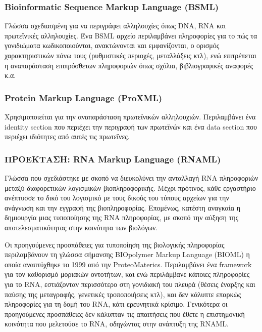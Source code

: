         \subsubsection{Bioinformatic Sequence Markup Language (BSML)}
            Γλώσσα σχεδιασμένη για να περιγράφει αλληλουχίες όπως DNA, RNA και πρωτεϊνικές αλληλουχίες.
            Ένα BSML αρχείο περιλαμβάνει πληροφορίες για το πώς τα γονιδιώματα κωδικοποιούνται, ανακτώνονται και εμφανίζονται, ο ορισμός χαρακτηριστικών πάνω τους (ρυθμιστικές περιοχές, μεταλλάξεις κτλ), ενώ επιτρέπεται η αναπαράσταση επιπρόσθετων πληροφοριών όπως σχόλια, βιβλιογραφικές αναφορές κ.α.

        \subsubsection{Protein Markup Language (ProXML)}
            Χρησιμοποιείται για την αναπαράσταση πρωτεϊνικών αλληλουχιών.
            Περιλαμβάνει ένα identity section που περιέχει την περιγραφή των πρωτεϊνών και ένα data section που περιέχει ιδιότητες από αυτές τις πρωτεΐνες.

        \subsubsection{ΠΡΟΕΚΤΑΣΗ: RNA Markup Language (RNAML)}
            Γλώσσα που σχεδιάστηκε με σκοπό να διευκολύνει την ανταλλαγή RNA πληροφοριών μεταξύ διαφορετικών λογισμικών βιοπληροφορικής. \cite{RNAML}
            Μέχρι πρότινος, κάθε εργαστήριο ανέπτυσσε το δικό του λογισμικό με τους δικούς του τύπους αρχείων για την ανάγνωση και την εγγραφή της βιοπληροφορίας.
            Επομένως, κατέστη αναγκαία η δημιουργία μιας τυποποίησης της RNA πληροφορίας, με σκοπό την αύξηση της αποτελεσματικότητας στην κοινότητα των βιολόγων.

            Οι προηγούμενες προσπάθειες για τυποποίηση της βιολογικής πληροφορίας περιλαμβάνουν τη γλώσσα σήμανσης BIOpolymer Markup Language (BIOML)  η οποία αναπτύχθηκε το 1999 από την ProteoMaterics.
            Περιλαμβάνει ένα framework για τον καθορισμό μοριακών οντοτήτων, και ενώ περιλάμβανε κάποιες πληροφορίες για το RNA, εστιάζονταν περισσότερο στη γονιδιακή του πλευρά
                (θέσεις έναρξης και παύσης της μεταγραφής, γενετικές τροποποιήσεις κτλ), και δεν κάλυπτε επαρκώς πληροφορίες για τη δομή του RNA, κάτι ερευνητικά κρίσιμο.
            Γενικότερα οι προηγούμενες προσπάθειες δεν κάλυπταν τις απαιτήσεις που έθετε η επιστημονική κοινότητα που μελετούσε το RNA, οδηγώντας στην ανάπτυξη της RNAML.

